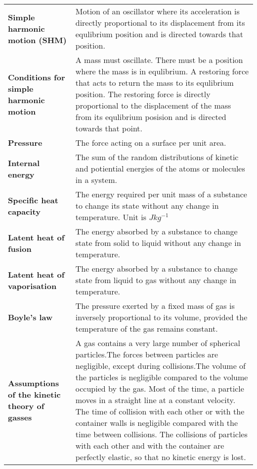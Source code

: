 \documentclass{article}
\begin{document}
\begin{longtable}{>{\bf\centering\arraybackslash}p{1in} 
  p{\textwidth-4\tabcolsep-1in}}
  Simple harmonic motion (SHM) & Motion of an oscillator where its acceleration
    is directly proportional to its displacement from its equlibrium position
    and is directed towards that position.\\
  Conditions for simple harmonic motion & A mass must oscillate. \newline
    \newline There must be a position where the mass is in equlibrium.\newline
    \newline A restoring force that acts to return the mass to its equlibrium
    position. The restoring force is directly proportional to the displacement
    of the mass from its equlibrium posision and is directed towards that point.
    \\ \midrule
  Pressure & The force acting on a surface per unit area.\\ \midrule
  Internal energy & The sum of the random distributions of kinetic and
    potiential energies of the atoms or molecules in a system.\\ \midrule
  Specific heat capacity & The energy required per unit mass of a substance to
    change its state without any change in temperature.\newline \newline
    Unit is $Jkg^{-1}$\\ \midrule
  Latent heat of fusion & The energy absorbed by a substance to change state
    from solid to liquid without any change in temperature. \\ \midrule
  Latent heat of vaporisation & The energy absorbed by a substance to change
    state from liquid to gas without any change in temperature. \\ \midrule
  Boyle's law & The pressure exerted by a fixed mass of gas is inversely
    proportional to its volume, provided the temperature of the gas remains
    constant.\\ \midrule
  Assumptions of the kinetic theory of gasses & A gas contains a very large
    number of spherical particles.\newline \newline The forces between particles
    are negligible, except during collisions.\newline \newline The volume of the
    particles is negligible compared to the volume occupied by the gas.\newline
    \newline Most of the time, a particle moves in a straight line at a constant
    velocity. The time of collision with each other or with the container walls
    is negligible compared with the time between collisions.\newline \newline
    The collisions of particles with each other and with the container are 
    perfectly elastic, so that no kinetic energy is lost.\\ \midrule
\end{longtable}
\end{document}
